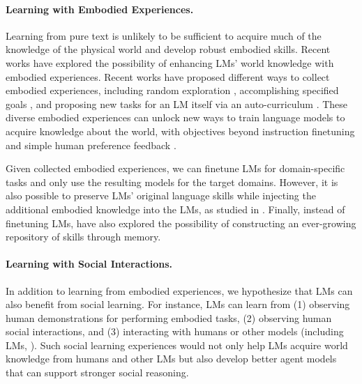 \documentclass{article}
\begin{document}
\paragraph{Learning with Embodied Experiences.} Learning from pure text is unlikely to be sufficient to acquire much of the knowledge of the physical world and develop robust embodied skills. Recent works have explored the possibility of enhancing LMs' world knowledge with embodied experiences. Recent works have proposed different ways to collect embodied experiences, including random exploration \citep{xiang2023language}, accomplishing specified goals \citep{xiang2023language,zeng2023agenttuning,wang2023mint}, and proposing new tasks for an LM itself via an auto-curriculum \citep{wang2023voyager}. These diverse embodied experiences can unlock new ways to train language models to acquire knowledge about the world, with objectives beyond instruction finetuning and simple human preference feedback \citep[e.g., RLHF, ][]{ouyang2022training}.

Given collected embodied experiences, we can finetune LMs for domain-specific tasks \citep[e.g.,][]{li2022pre} and only use the resulting models for the target domains. However, it is also possible to preserve LMs' original language skills while injecting the additional embodied knowledge into the LMs, as studied in \citep{xiang2023language}. Finally, instead of finetuning LMs, \cite{wang2023voyager} have also explored the possibility of constructing an ever-growing repository of skills through memory.

\paragraph{Learning with Social Interactions.} In addition to learning from embodied experiences, we hypothesize that LMs can also benefit from social learning. For instance, LMs can learn from (1) observing human demonstrations for performing embodied tasks, (2) observing human social interactions, and (3) interacting with humans or other models (including LMs, \citet{liu2023training}). Such social learning experiences would not only help LMs acquire world knowledge from humans and other LMs but also develop better agent models that can support stronger social reasoning.
\end{document}
